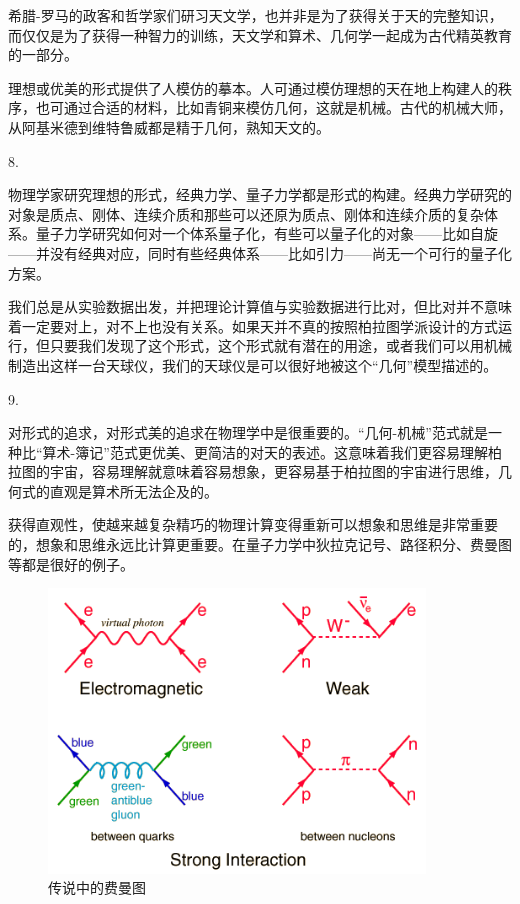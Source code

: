 希腊-罗马的政客和哲学家们研习天文学，也并非是为了获得关于天的完整知识，而仅仅是为了获得一种智力的训练，天文学和算术、几何学一起成为古代精英教育的一部分。

理想或优美的形式提供了人模仿的摹本。人可通过模仿理想的天在地上构建人的秩序，也可通过合适的材料，比如青铜来模仿几何，这就是机械。古代的机械大师，从阿基米德到维特鲁威都是精于几何，熟知天文的。

8.

物理学家研究理想的形式，经典力学、量子力学都是形式的构建。经典力学研究的对象是质点、刚体、连续介质和那些可以还原为质点、刚体和连续介质的复杂体系。量子力学研究如何对一个体系量子化，有些可以量子化的对象——比如自旋——并没有经典对应，同时有些经典体系——比如引力——尚无一个可行的量子化方案。

我们总是从实验数据出发，并把理论计算值与实验数据进行比对，但比对并不意味着一定要对上，对不上也没有关系。如果天并不真的按照柏拉图学派设计的方式运行，但只要我们发现了这个形式，这个形式就有潜在的用途，或者我们可以用机械制造出这样一台天球仪，我们的天球仪是可以很好地被这个“几何”模型描述的。

9.

对形式的追求，对形式美的追求在物理学中是很重要的。“几何-机械”范式就是一种比“算术-簿记”范式更优美、更简洁的对天的表述。这意味着我们更容易理解柏拉图的宇宙，容易理解就意味着容易想象，更容易基于柏拉图的宇宙进行思维，几何式的直观是算术所无法企及的。

获得直观性，使越来越复杂精巧的物理计算变得重新可以想象和思维是非常重要的，想象和思维永远比计算更重要。在量子力学中狄拉克记号、路径积分、费曼图等都是很好的例子。

\begin{figure}[htbp]
\begin{center}
\includegraphics[width=10cm]{Appendix/feynmandiagram.png}
\caption{传说中的费曼图}
\end{center}
\end{figure}


